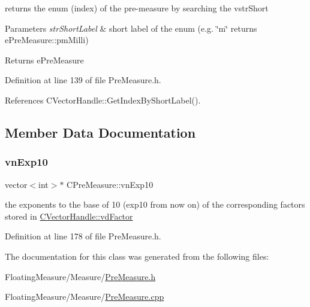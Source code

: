 returns the enum (index) of the pre-\/measure by searching the vstr\+Short 


\begin{DoxyParams}{Parameters}
{\em str\+Short\+Label} & short label of the enum (e.\+g. \char`\"{}m\char`\"{} returns e\+Pre\+Measure\+::pm\+Milli) \\
\hline
\end{DoxyParams}
\begin{DoxyReturn}{Returns}
e\+Pre\+Measure 
\end{DoxyReturn}


Definition at line 139 of file Pre\+Measure.\+h.



References C\+Vector\+Handle\+::\+Get\+Index\+By\+Short\+Label().



\subsection{Member Data Documentation}
\mbox{\label{classCPreMeasure_a2c50eadae55427f0d77a013b3fab0fdb}} 
\subsubsection{\texorpdfstring{vn\+Exp10}{vnExp10}}
{\footnotesize\ttfamily vector$<$int$>$$\ast$ C\+Pre\+Measure\+::vn\+Exp10\hspace{0.3cm}{\ttfamily [protected]}}



the exponents to the base of 10 (exp10 from now on) of the corresponding factors stored in \hyperlink{classCVectorHandle_af8f8b2e0da8363e695872ca85f33364e}{C\+Vector\+Handle\+::vd\+Factor} 



Definition at line 178 of file Pre\+Measure.\+h.



The documentation for this class was generated from the following files\+:\begin{DoxyCompactItemize}
\item 
Floating\+Measure/\+Measure/\hyperlink{PreMeasure_8h}{Pre\+Measure.\+h}\item 
Floating\+Measure/\+Measure/\hyperlink{PreMeasure_8cpp}{Pre\+Measure.\+cpp}\end{DoxyCompactItemize}
